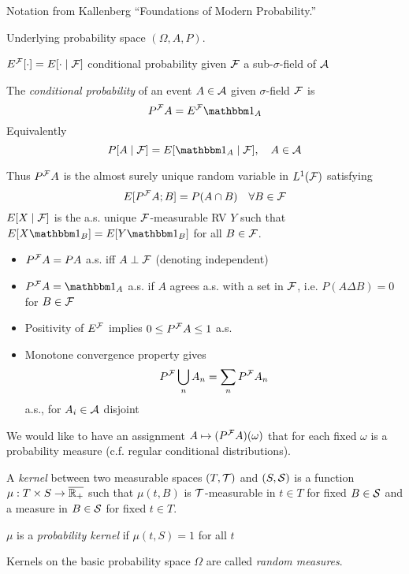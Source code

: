 
Notation from Kallenberg ``Foundations of Modern Probability.''

Underlying probability space $(\Omega, A, P)$.

$E^{\mathcal{F}}[\cdot] = E[\cdot \mid \mathcal{F}]$ conditional probability given
$\mathcal{F}$ a sub-$\sigma$-field of $\mathcal{A}$


\begin{definition}
  The \emph{conditional probability} of an event $A \in \mathcal{A}$ given
    $\sigma$-field $\mathcal{F}$ is
    \[
      P^{\cF}A = E^{\cF} \ind_A
    \]
    Equivalently
    \[
      P[A \mid \cF] = E[\ind_A \mid \cF],\quad A \in \cA
    \]
\end{definition}

Thus $P^{\mathcal{F}} A$ is the almost surely unique random variable in $L^1(\mathcal{F})$ satisfying
\[
  E[P^{\mathcal{F}} A; B] = P(A \cap B) \quad \forall B \in \mathcal{F}
\]
$E[X \mid \mathcal{F}]$ is the a.s. unique $\mathcal{F}$-measurable RV $Y$
such that $E[X \ind_B] = E[Y \ind_B]$ for all $B \in \mathcal{F}$.

\begin{itemize}
  \item $P^{\mathcal{F}} A = P A$ a.s. iff $A \perp \mathcal{F}$ (denoting independent)
  \item $P^\cF A = \ind_A$ a.s. if $A$ agrees a.s. with a set in $\mathcal{F}$, i.e.
    $P(A \Delta B) = 0$ for $B \in \mathcal{F}$
  \item Positivity of $E^{\mathcal{F}}$ implies $0 \leq P^{\mathcal{F}} A \leq 1$ a.s.
  \item Monotone convergence property gives
    \[
      P^{\mathcal{F}} \bigcup_n A_n = \sum_n P^{\mathcal{F}} A_n
    \]
    a.s., for $A_i \in \mathcal{A}$ disjoint
\end{itemize}

We would like to have an assignment $A \mapsto (P^{\mathcal{F}} A)(\omega)$
that for each fixed $\omega$ is a probability measure
(c.f. regular conditional distributions).

\begin{definition}
  A \emph{kernel} between two measurable spaces $(T, \mathcal{T})$
  and $(S, \mathcal{S})$ is a function $\mu : T \times S \to \overline{\mathbb{R}_+}$
  such that $\mu(t, B)$ is $\mathcal{T}$-measurable in $t \in T$ for fixed $B \in \mathcal{S}$
  and a measure in $B \in \mathcal{S}$ for fixed $t \in T$.

  $\mu$ is a \emph{probability kernel} if $\mu(t, S) = 1$ for all $t$

  Kernels on the basic probability space $\Omega$ are called
  \emph{random measures}.
\end{definition}

